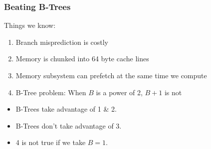 \documentclass[xcolor=dvipsnames]{beamer}
\begin{document}
\begin{frame}
   \frametitle{Beating B-Trees}

   Things we know:
   \begin{enumerate}[<+->]
      \item Branch misprediction is costly
      \item Memory is chunked into 64 byte cache lines
      \item Memory subsystem can prefetch at the same time we compute
      \item B-Tree problem: When $B$ is a power of 2, $B+1$ is not
   \end{enumerate}
   \begin{itemize}
      \item<+->B-Trees take advantage of 1 \& 2.
      \item<+->B-Trees don't take advantage of 3.
      \item<+->4 is not true if we take $B=1$.
   \end{itemize}

\end{frame}
\end{document}
